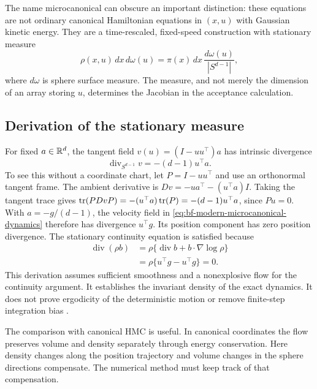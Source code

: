 The name microcanonical can obscure an important distinction: these equations
are not ordinary canonical Hamiltonian equations in $(x,u)$ with Gaussian
kinetic energy. They are a time-rescaled, fixed-speed construction with
stationary measure
\begin{equation}
 \rho(x,u)\,dx\,d\omega(u)
       =\pi(x)\,dx\,\frac{d\omega(u)}{|S^{d-1}|},
 \label{eq:bf-modern-sphere-target}
\end{equation}
where $d\omega$ is sphere surface measure. The measure, and not merely the
dimension of an array storing $u$, determines the Jacobian in the acceptance
calculation.

\subsection{Derivation of the stationary measure}

For fixed $a\in\mathbb{R}^d$, the tangent field
$v(u)=(I-uu^\top)a$ has intrinsic divergence
\begin{equation}
 \operatorname{div}_{S^{d-1}}v=-(d-1)u^\top a.
 \label{eq:bf-modern-sphere-divergence}
\end{equation}
To see this without a coordinate chart, let $P=I-uu^\top$ and use an
orthonormal tangent frame. The ambient derivative is
$Dv=-u a^\top-(u^\top a)I$. Taking the tangent trace gives
$\operatorname{tr}(P Dv P)=-(u^\top a)\operatorname{tr}(P)=-(d-1)u^\top a$, since $Pu=0$.
With $a=-g/(d-1)$, the velocity field in
\eqref{eq:bf-modern-microcanonical-dynamics} therefore has divergence
$u^\top g$. Its position component has zero position divergence. The
stationary continuity equation is satisfied because
\begin{align}
 \operatorname{div}(\rho b)
 &=\rho\{\operatorname{div}b+b\cdot\nabla\log\rho\}\\
 &=\rho\{u^\top g-u^\top g\}=0.
 \label{eq:bf-modern-sphere-stationarity}
\end{align}
This derivation assumes sufficient smoothness and a nonexplosive flow for the
continuity argument. It establishes the invariant density of the exact
dynamics. It does not prove ergodicity of the deterministic motion or remove
finite-step integration bias \citep[Appendix B.4]{robnik2025mams}.

The comparison with canonical HMC is useful. In canonical coordinates the
flow preserves volume and density separately through energy conservation.
Here density changes along the position trajectory and volume changes in the
sphere directions compensate. The numerical method must keep track of that
compensation.

